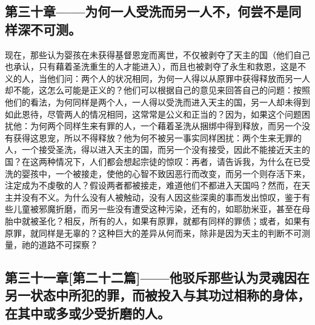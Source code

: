 
\subsection{第三十章——为何一人受洗而另一人不，何尝不是同样深不可测。}

现在，那些认为婴孩在未获得基督恩宠而离世，不仅被剥夺了天主的国（他们自己也承认，只有藉着圣洗重生的人才能进入），而且也被剥夺了永生和救恩，这是不义的人，当他们问：两个人的状况相同，为何一人得以从原罪中获得释放而另一人却不能，这怎么可能是正义的？他们可以根据自己的意见来回答自己的问题：按照他们的看法，为何同样是两个人，一人得以受洗而进入天主的国，另一人却未得到如此恩待，尽管两人的情况相同，这常常是公义和正当的？因为，如果这个问题困扰他：为何两个同样生来有罪的人，一个藉着圣洗从捆绑中得到释放，而另一个没有获得这恩宠，所以不得释放？他为何不被另一事实同样困扰：两个生来无罪的人，一个接受圣洗，得以进入天主的国，而另一个没有接受，因此不能接近天主的国？在这两种情况下，人们都会想起宗徒的惊叹：再者，请告诉我，为什么在已受洗的婴孩中，一个被接走，使他的心智不致因恶行而改变，而另一个则存活下来，注定成为不虔敬的人？假设两者都被接走，难道他们不都进入天国吗？然而，在天主并没有不义。为什么没有人被触动，没有人因这些深奥的事而发出惊叹，鉴于有些儿童被邪魔折磨，而另一些没有遭受这种污染，还有的，如耶肋米亚，甚至在母胎中就被圣化？相反，所有的人，如果有原罪，就都有同样的罪债；或者，如果有原罪，就同样是无辜的？这种巨大的差异从何而来，除非是因为天主的判断不可测量，祂的道路不可探察？\par


\subsection{第三十一章[第二十二篇]——他驳斥那些认为灵魂因在另一状态中所犯的罪，而被投入与其功过相称的身体，在其中或多或少受折磨的人。}

